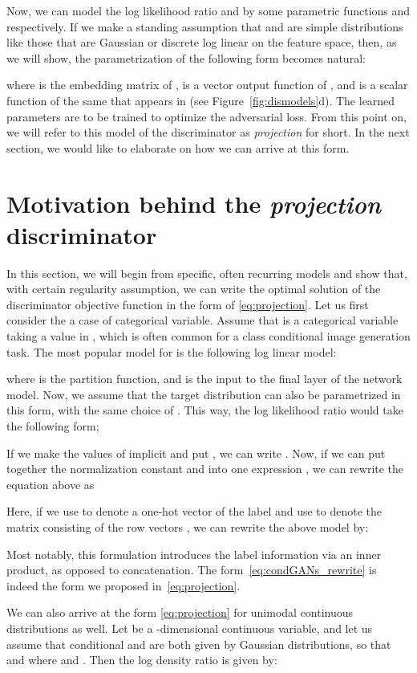 \documentclass{article}
\begin{document}
Now, we can model the log likelihood ratio  and  by some parametric functions  and  respectively.  
If we make a standing assumption that  and  are simple distributions like those that are Gaussian or discrete log linear on the feature space, then, as we will show, the parametrization of the following form becomes natural:

where  is the embedding matrix of ,  is a vector output function of , and  is a scalar function of
the same  that appears in  (see Figure~\ref{fig:dismodels}d).
The learned parameters  are to be trained to optimize the adversarial loss.
From this point on, we will refer to this model of the discriminator as \textit{projection} for short.
In the next section, we would like to elaborate on how we can arrive at this form.

\section{Motivation behind the \textit{projection} discriminator}
In this section, we will begin from specific, often recurring models and show 
that, with certain regularity assumption, we can write the optimal solution of the 
discriminator objective function in the form of \eqref{eq:projection}. Let us first consider the a case of categorical variable. Assume that  is a categorical variable taking a value in , which is often common for a class conditional image generation task. 
The most popular model for  is the following log linear model: 

where  is the partition function, and  is the input to the final layer of the network model. 
Now, we assume that the target distribution  can also be parametrized in this form, with the same choice of . This way, the log likelihood ratio would take the following form;  

If we make the values of  implicit and put , we can write . 
Now, if we can put together the normalization constant   and  into one expression , we can rewrite the equation above as 

Here, if we use  to denote a one-hot vector of the label  and use  to denote the matrix consisting of the row vectors , we can rewrite the above model by:
  
Most notably, this formulation introduces the label information via an inner product, as opposed to concatenation. 
The form~\eqref{eq:condGANs_rewrite} is indeed the form we proposed in~\eqref{eq:projection}. 

We can also arrive at the form \eqref{eq:projection} for unimodal continuous distributions  as well.  
Let  be a -dimensional continuous variable, and let us assume that conditional  and  are both given by Gaussian distributions, so that  and  where  and .
Then the log density ratio  is given by:
 
\end{document}

